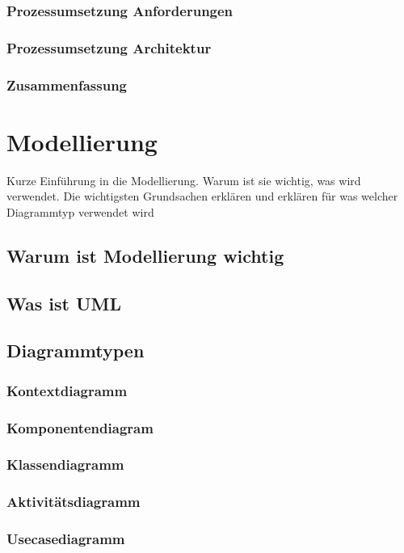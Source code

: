 \documentclass[Master,MSE,german]{twbook}
\begin{document}
\subsection{Prozessumsetzung Anforderungen}
\subsection{Prozessumsetzung Architektur}
\subsection{Zusammenfassung}


\chapter{Modellierung}
Kurze Einführung in die Modellierung. Warum ist sie wichtig, was wird verwendet. Die wichtigsten Grundsachen erklären und erklären für was welcher Diagrammtyp verwendet wird

\section{Warum ist Modellierung wichtig}
\section{Was ist UML}

\section{Diagrammtypen}
\subsection{Kontextdiagramm}
\subsection{Komponentendiagram}
\subsection{Klassendiagramm}
\subsection{Aktivitätsdiagramm}
\subsection{Usecasediagramm}
\end{document}
